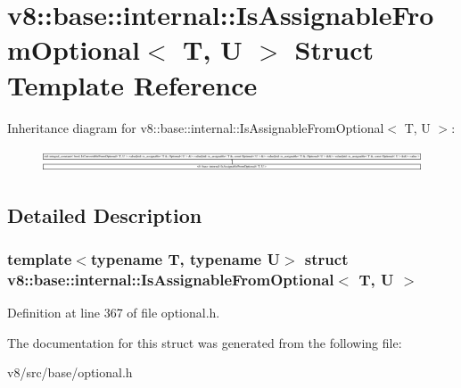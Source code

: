 \hypertarget{structv8_1_1base_1_1internal_1_1IsAssignableFromOptional}{}\section{v8\+:\+:base\+:\+:internal\+:\+:Is\+Assignable\+From\+Optional$<$ T, U $>$ Struct Template Reference}
\label{structv8_1_1base_1_1internal_1_1IsAssignableFromOptional}
Inheritance diagram for v8\+:\+:base\+:\+:internal\+:\+:Is\+Assignable\+From\+Optional$<$ T, U $>$\+:\begin{figure}[H]
\begin{center}
\leavevmode
\includegraphics[height=0.678788cm]{structv8_1_1base_1_1internal_1_1IsAssignableFromOptional}
\end{center}
\end{figure}


\subsection{Detailed Description}
\subsubsection*{template$<$typename T, typename U$>$\newline
struct v8\+::base\+::internal\+::\+Is\+Assignable\+From\+Optional$<$ T, U $>$}



Definition at line 367 of file optional.\+h.



The documentation for this struct was generated from the following file\+:\begin{DoxyCompactItemize}
\item 
v8/src/base/optional.\+h\end{DoxyCompactItemize}
